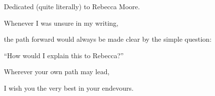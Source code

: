 Dedicated (quite literally) to Rebecca Moore.

Whenever I was unsure in my writing,

the path forward would always be made clear by the simple question:

``How would I explain this to Rebecca?''

Wherever your own path may lead,

I wish you the very best in your endevours.
